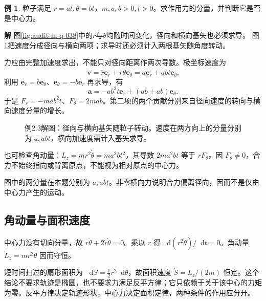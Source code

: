 \documentclass[11pt,openany,fontset=fandol]{ctexbook}
\theoremstyle{plain}\newtheorem{theorem}{定理}[chapter]\newtheorem{proposition}[theorem]{命题}
\theoremstyle{definition}\newtheorem{definition}{定义}[chapter]\newtheorem{example}{例}[chapter]
\theoremstyle{remark}\newtheorem*{remark}{说明}
\newcommand{\SolutionStart}{\par\nobreak\medskip\nobreak\noindent\textbf{解}\quad\ignorespaces}
\newenvironment{solution}{\SolutionStart}{\par\medskip}
\newcommand{\dd}{\mathop{}\!\mathrm d}\newcommand{\ii}{\mathrm i}\newcommand{\ee}{\mathrm e}
\newcommand{\vct}[1]{\bm{#1}}\newcommand{\Rea}{\operatorname{Re}}\newcommand{\Ima}{\operatorname{Im}}
\begin{document}
\begin{example}
粒子满足 $r=at,\theta=bt$，$m,a,b>0,t>0$。求作用力的分量，并判断它是否是中心力。
\end{example}

\begin{solution}
图\ref{fig:audit-m-q-038}中的$r$与$\theta$均随时间变化，径向和横向基矢也必须求导。
图\ref{fig:eg-2-3}把速度分成径向与横向两项；求导时还必须计入两根基矢随角度转动。

力应由完整加速度求出，不能只对径向距离作两次导数。极坐标速度为
\[
\vct v=\dot r\vct e_r+r\dot\theta\vct e_\theta
=a\vct e_r+abt\vct e_\theta.
\]
利用 $\dot{\vct e}_r=b\vct e_\theta$、$\dot{\vct e}_\theta=-b\vct e_r$ 再求导，有
\[
\vct a=-ab^2t\vct e_r+(ab+ab)\vct e_\theta.
\]
于是 $F_r=-mab^2t$、$F_\theta=2mab$。第二项的两个贡献分别来自径向速度的转向与横向速度分量的增长。

\begin{figure}[H]
\centering
{}
\caption{例2.3解图：径向与横向基矢随粒子转动。速度在两方向上的分量分别为 $a,abt$，横向加速度需计入基矢求导。}\label{fig:eg-2-3}
\end{figure}

也可检查角动量：$L_z=mr^2\dot\theta=ma^2bt^2$，其导数 $2ma^2bt$ 等于 $rF_\theta$。因 $F_\theta\ne0$，合力不始终指向或背离原点，不能视为相对原点的中心力。

图中的两分量在本题分别为 $a,abt$。非零横向力说明合力偏离径向，因而不是仅由中心力产生的运动。
\end{solution}

\subsection{角动量与面积速度}
中心力没有切向分量，故 $r\ddot\theta+2\dot r\dot\theta=0$。乘以 $r$ 得 $\dd(r^2\dot\theta)/\dd t=0$。角动量 $L_z=mr^2\dot\theta$ 因而守恒。

短时间扫过的扇形面积为 $\dd S=\tfrac12r^2\dd\theta$，故面积速度 $\dot S=L_z/(2m)$ 恒定。这个结论不要求轨迹是椭圆，也不要求力满足反平方律；它只依赖于关于该中心的力矩为零。反平方律决定轨迹形状，中心力决定面积定律，两种条件的作用应分开。
\end{document}
